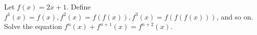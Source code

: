 Let $f(x)=2x+1$. Define $f^{1}(x)=f(x), f^{2}(x)=f(f(x)), f^{3}(x)=f(f(f(x)))$, and so on. Solve the equation $f^{n}(x)+f^{n+1}(x)=f^{n+2}(x)$.
